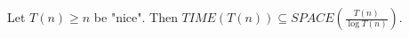 \begin{theorem}
    Let $T(n) \geq n$ be "nice". Then $TIME(T(n)) \subseteq SPACE(\frac{T(n)}{\log T(n)}).$
\end{theorem}
